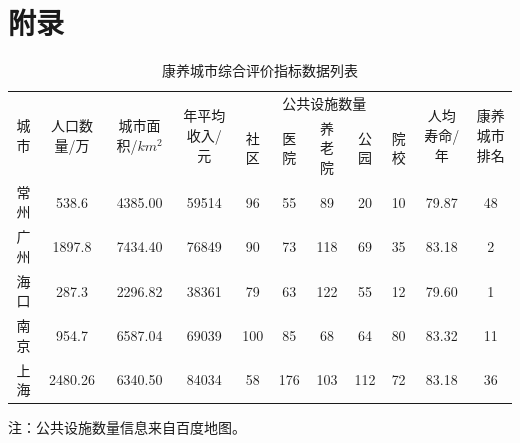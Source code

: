 \documentclass[12pt,a4paper]{article}
\begin{document}
\section*{附录}

\begin{table}[h]
  \centering
  \caption{康养城市综合评价指标数据列表}
  \begin{adjustbox}{width=\textwidth}
  \begin{tabular}{c|c|c|c|ccccc|c|c}
    \toprule[2pt]
    \multirow{2}{*}{城市} & \multirow{2}{*}{人口数量/万} & \multirow{2}{*}{城市面积/$km^2$}& \multirow{2}{*}{年平均收入/元}& \multicolumn{5}{c|}{公共设施数量} &\multirow{2}{*}{人均寿命/年}&\multirow{2}{*}{康养城市排名\cite{06}}\\
    \cline{5-9}
    & & & & 社区 & 医院 & 养老院 & 公园 & 院校 & &\\
    \midrule[1pt]
    常州 & 538.6 & 4385.00 &59514& 96 & 55 & 89 & 20 & 10 & 79.87 &48\\
    广州 & 1897.8 & 7434.40 &76849& 90 & 73 & 118 & 69 & 35 & 83.18 &2\\
    海口 & 287.3 & 2296.82 &38361& 79 & 63 & 122 & 55 & 12 & 79.60 &1\\
    南京 & 954.7 & 6587.04 &69039& 100 & 85 & 68 & 64 & 80 & 83.32 &11\\
    上海 & 2480.26 & 6340.50 &84034& 58 & 176 & 103 & 112 & 72 & 83.18 &36\\
    \bottomrule[2pt]
  \end{tabular}
  \end{adjustbox}

  \vspace{0.5em}
  {\footnotesize 注：公共设施数量信息来自百度地图。}
\end{table}
\end{document}
